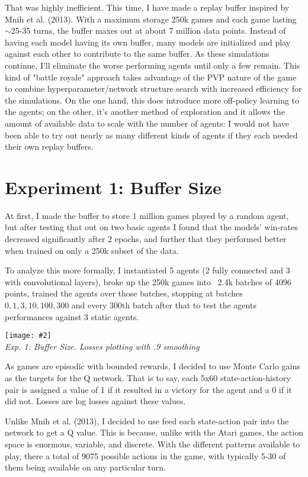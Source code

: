 \documentclass{article}
\newcommand{\pic}[3]{
\begin{center}
\texttt{[image: \#2]}\\
\small\textit{#3}
\end{center}
}
\begin{document}
That was highly inefficient. This time, I have made a replay buffer inspired by Mnih et al. (2013). With a maximum storage 250k games and each game lasting $\sim$25-35 turns, the buffer maxes out at about 7 million data points. Instead of having each model having its own buffer, many models are initialized and play against each other to contribute to the same buffer. As these simulations continue, I'll eliminate the worse performing agents until only a few remain. This kind of "battle royale" approach takes advantage of the PVP nature of the game to combine hyperparameter/network structure search with increased efficiency for the simulations. On the one hand, this does introduce more off-policy learning to the agents; on the other, it's another method of exploration and it allows the amount of available data to scale with the number of agents: I would not have been able to try out nearly as many different kinds of agents if they each needed their own replay buffers.

\section{Experiment 1: Buffer Size}

At first, I made the buffer to store 1 million games played by a random agent, but after testing that out on two basic agents I found that the models' win-rates decreased significantly after 2 epochs, and further that they performed better when trained on only a 250k subset of the data. 

To analyze this more formally, I instantiated 5 agents (2 fully connected and 3 with convolutional layers), broke up the 250k games into ~2.4k batches of 4096 points, trained the agents over those batches, stopping at batches $0, 1, 3, 10, 100, 300$ and every 300th batch after that to test the agents performances against 3 static agents.

\pic{.4}{Exp1.png}{Exp. 1: Buffer Size. Losses plotting with .9 smoothing}

As games are episodic with bounded rewards, I decided to use Monte Carlo gains as the targets for the Q network. That is to say, each 5x60 state-action-history pair is assigned a value of 1 if it resulted in a victory for the agent and a 0 if it did not. Losses are log losses against these values.

Unlike Mnih et al. (2013), I decided to use feed each state-action pair into the network to get a Q value. This is because, unlike with the Atari games, the action space is enormous, variable, and discrete. With the different patterns available to play, there a total of 9075 possible actions in the game, with typically 5-30 of them being available on any particular turn. 
\end{document}
